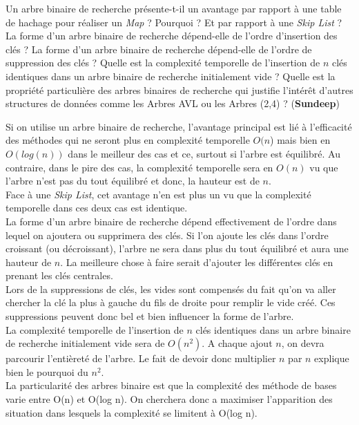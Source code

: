 Un arbre binaire de recherche présente-t-il un avantage par rapport à une table de hachage pour réaliser un \textit{Map} ? Pourquoi ? Et par rapport à une \textit{Skip List} ? \\
La forme d’un arbre binaire de recherche dépend-elle de l’ordre d’insertion des clés ? La forme d’un arbre binaire de recherche dépend-elle de l’ordre de suppression des clés ? Quelle est la complexité temporelle de l’insertion de $\textit{n}$ clés identiques dans un arbre binaire de recherche initialement vide ? Quelle est la propriété particulière des arbres binaires de recherche qui justifie l’intérêt d’autres structures de données comme les Arbres AVL ou les Arbres (2,4) ? (\textbf{Sundeep}) \\
\bigskip

Si on utilise un arbre binaire de recherche, l'avantage principal est lié à l'efficacité des méthodes qui ne seront plus en complexité temporelle $O(n$) mais bien en $O(log (n))$ dans le meilleur des cas et ce, surtout si l'arbre est équilibré. Au contraire, dans le pire des cas, la complexité temporelle sera en $O(n)$ vu que l'arbre n'est pas du tout équilibré et donc, la hauteur est de $n$. \\

Face à une \textit{Skip List}, cet avantage n'en est plus un vu que la complexité temporelle dans ces deux cas est identique. \\ 

La forme d'un arbre binaire de recherche dépend effectivement de l'ordre dans lequel on ajoutera ou supprimera des clés. Si l'on ajoute les clés dans l'ordre croissant (ou décroissant), l'arbre ne sera dans plus du tout équilibré et aura une hauteur de $n$. La meilleure chose à faire serait d'ajouter les différentes clés en prenant les clés centrales. \\
Lors de la suppressions de clés, les vides sont compensés du fait qu'on va aller chercher la clé la plus à gauche du fils de droite pour remplir le vide créé. Ces suppressions peuvent donc bel et bien influencer la forme de l'arbre. \\

La complexité temporelle de l'insertion de $\textit{n}$ clés identiques dans un arbre binaire de recherche initialement vide sera de $O(n^2)$. A chaque ajout $n$, on devra parcourir l'entièreté de l'arbre. Le fait de devoir donc multiplier $n$ par $n$ explique bien le pourquoi du $n^2$. \\ 

La particularité des arbres binaire est que la complexité des méthode de bases varie entre O(n) et O(log n). On cherchera donc a maximiser l'apparition des situation dans lesquels la complexité se limitent à O(log n). \\
 
